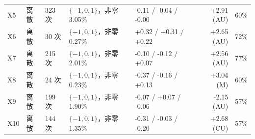 \begin{tabular}{lllllrr}
X5 & 离散 & 323 次 & $\{-1,0,1\}$，非零 3.05\% & -0.11 / -0.04 / -0.00 & +2.91 (AU) & 60\% \\
X6 & 离散 & 30 次 & $\{-1,0,1\}$，非零 0.27\% & +0.32 / +0.31 / +0.22 & +2.65 (AU) & 72\% \\
X7 & 离散 & 215 次 & $\{-1,0,1\}$，非零 2.01\% & -0.10 / -0.12 / +0.07 & +2.56 (AU) & 77\% \\
X8 & 离散 & 24 次 & $\{-1,0,1\}$，非零 0.23\% & -0.37 / -0.16 / +0.13 & +3.04 (M) & 60\% \\
X9 & 离散 & 199 次 & $\{-1,0,1\}$，非零 1.90\% & -0.07 / +0.07 / -0.06 & -2.15 (AU) & 57\% \\
X10 & 离散 & 144 次 & $\{-1,0,1\}$，非零 1.35\% & -0.31 / -0.03 / -0.20 & +2.68 (CU) & 57\% \\
\bottomrule
\end{tabular}
